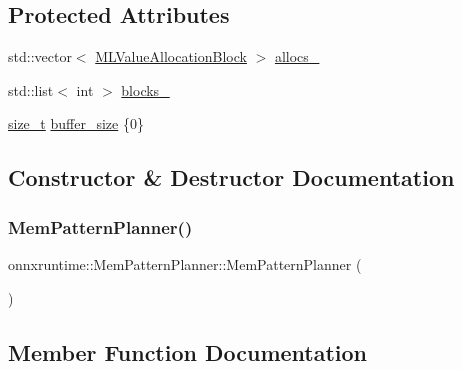 \subsection*{Protected Attributes}
\begin{DoxyCompactItemize}
\item 
std\+::vector$<$ \mbox{\hyperlink{structonnxruntime_1_1MemPatternPlanner_1_1MLValueAllocationBlock}{M\+L\+Value\+Allocation\+Block}} $>$ \mbox{\hyperlink{classonnxruntime_1_1MemPatternPlanner_af1e6887a98645ea63af44d98279d7b7b}{allocs\+\_\+}}
\item 
std\+::list$<$ int $>$ \mbox{\hyperlink{classonnxruntime_1_1MemPatternPlanner_a31d6add32bbd81db6d3174ef6e187e6f}{blocks\+\_\+}}
\item 
\mbox{\hyperlink{mlasi_8h_a503efbc1c6e50825320ad909366b78ab}{size\+\_\+t}} \mbox{\hyperlink{classonnxruntime_1_1MemPatternPlanner_adc47283af8c8a28ec80e3931988e4903}{buffer\+\_\+size}} \{0\}
\end{DoxyCompactItemize}


\subsection{Constructor \& Destructor Documentation}
\mbox{\label{classonnxruntime_1_1MemPatternPlanner_a331275f6172142627b52ecc09ef5c8d4}} 
\subsubsection{\texorpdfstring{Mem\+Pattern\+Planner()}{MemPatternPlanner()}}
{\footnotesize\ttfamily onnxruntime\+::\+Mem\+Pattern\+Planner\+::\+Mem\+Pattern\+Planner (\begin{DoxyParamCaption}{ }\end{DoxyParamCaption})\hspace{0.3cm}{\ttfamily [default]}}



\subsection{Member Function Documentation}
\mbox{\label{classonnxruntime_1_1MemPatternPlanner_a0bfd9cf766b9735859210c381856a357}} 
